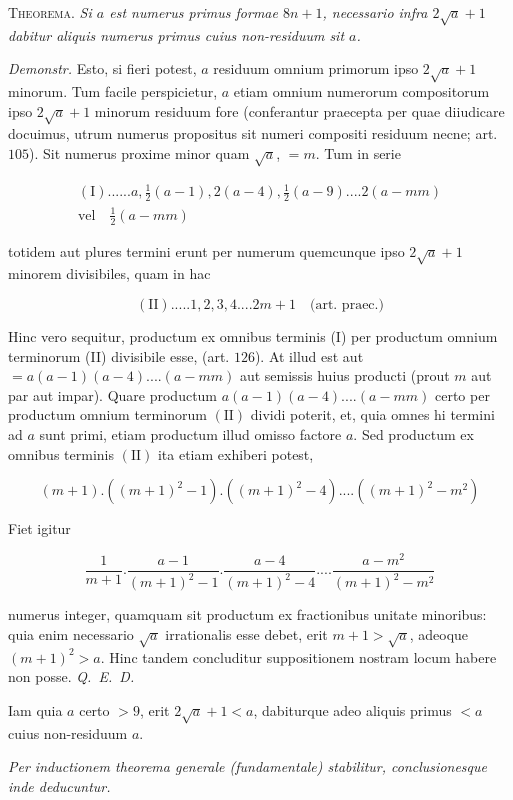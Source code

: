 
\textsc{Theorema.} \textit{Si $a$ est numerus primus formae $8n+1$, necessario infra $2\surd a+1$ dabitur aliquis numerus primus cuius non-residuum sit $a$.}

\textit{Demonstr.} Esto, si fieri potest, $a$ residuum omnium primorum ipso $2\surd a+1$ minorum. Tum facile perspicietur, $a$ etiam omnium numerorum compositorum ipso $2\surd a+1$ minorum residuum fore (conferantur praecepta per quae diiudicare docuimus, utrum numerus propositus sit numeri compositi residuum necne; art. $105$). Sit numerus proxime minor quam $\surd a$, $=m$. Tum in serie

\[
\begin{gathered}(\mathrm I)......a,\tfrac12(a-1),2(a-4),\tfrac12(a-9)....2(a-mm)\\ \text{vel}\quad\tfrac12(a-mm)\end{gathered}
\]

totidem aut plures termini erunt per numerum quemcunque ipso $2\surd a+1$ minorem divisibiles, quam in hac

\[
(\mathrm{II}).....1,2,3,4....2m+1\quad\text{(art. praec.)}
\]

Hinc vero sequitur, productum ex omnibus terminis (I) per productum omnium terminorum (II) divisibile esse, (art. $126$). At illud est aut \mbox{$=a(a-1)(a-4)....(a-mm)$} aut semissis huius producti (prout $m$ aut par aut impar). Quare productum $a(a-1)(a-4)....(a-mm)$ certo per productum omnium terminorum $(\mathrm{II})$ dividi poterit, et, quia omnes hi termini ad $a$ sunt primi, etiam productum illud omisso factore $a$. Sed productum ex omnibus terminis $(\mathrm{II})$ ita etiam exhiberi potest,

\[
(m+1).((m+1)^2-1).((m+1)^2-4)....((m+1)^2-m^2)
\]

Fiet igitur

\[
\frac1{m+1}.\frac{a-1}{(m+1)^2-1}.\frac{a-4}{(m+1)^2-4}....\frac{a-m^2}{(m+1)^2-m^2}
\]

numerus integer, quamquam sit productum ex fractionibus unitate minoribus: quia enim necessario $\surd a$ irrationalis esse debet, erit $m+1>\surd a$, adeoque $(m+1)^2>a.$ Hinc tandem concluditur suppositionem nostram locum habere non posse. \textit{Q.\ E.\ D.}

Iam quia $a$ certo $>9$, erit $2\surd a+1<a$, dabiturque adeo aliquis primus $<a$ cuius non-residuum $a$.

\begin{center}\textit{Per inductionem theorema generale (fundamentale) stabilitur, conclusionesque inde deducuntur.}\end{center}

